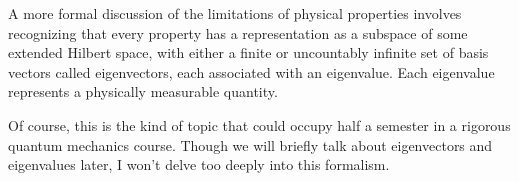 \documentclass[preview]{standalone}
\begin{document}
\begin{center}
A more formal discussion of the limitations of physical properties involves recognizing that every property has a representation as a subspace of some extended Hilbert space, with either a finite or uncountably infinite set of basis vectors called eigenvectors, each associated with an eigenvalue. Each eigenvalue represents a physically measurable quantity.

            Of course, this is the kind of topic that could occupy half a semester in a rigorous quantum mechanics course. Though we will briefly talk about eigenvectors and eigenvalues later, I won't delve too deeply into this formalism.
\end{center}
\end{document}
